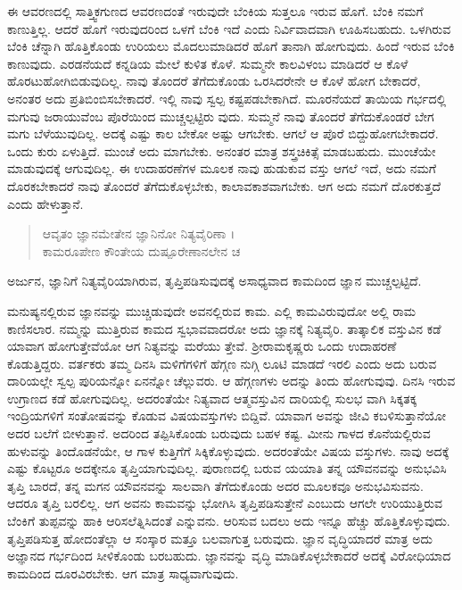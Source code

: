 ಈ ಆವರಣದಲ್ಲಿ ಸಾತ್ತ್ವಿಕಗುಣದ ಆವರಣದಂತೆ ಇರುವುದೇ ಬೆಂಕಿಯ ಸುತ್ತಲೂ ಇರುವ ಹೊಗೆ. ಬೆಂಕಿ ನಮಗೆ ಕಾಣುತ್ತಿಲ್ಲ. ಆದರೆ ಹೊಗೆ ಇರುವುದರಿಂದ ಒಳಗೆ ಬೆಂಕಿ ಇದೆ ಎಂದು ನಿರ್ವಿವಾದವಾಗಿ ಊಹಿಸಬಹುದು. ಒಳಗಿರುವ ಬೆಂಕಿ ಚೆನ್ನಾಗಿ ಹೊತ್ತಿಕೊಂಡು ಉರಿಯಲು ಮೊದಲುಮಾಡಿದರೆ ಹೊಗೆ ತಾನಾಗಿ ಹೋಗುವುದು. ಹಿಂದೆ ಇರುವ ಬೆಂಕಿ ಕಾಣುವುದು. ಎರಡನೆಯದೆ ಕನ್ನಡಿಯ ಮೇಲೆ ಕುಳಿತ ಕೊಳೆ. ಸುಮ್ಮನೇ ಕಾಲವಿಳಂಬ ಮಾಡಿದರೆ ಆ ಕೊಳೆ ಹೊರಟುಹೋಗಿಬಿಡುವುದಿಲ್ಲ. ನಾವು ತೊಂದರೆ ತೆಗೆದುಕೊಂಡು ಒರಸಿದರೇನೇ ಆ ಕೊಳೆ ಹೋಗ ಬೇಕಾದರೆ, ಅನಂತರ ಅದು ಪ್ರತಿಬಿಂಬಿಸಬೇಕಾದರೆ. ಇಲ್ಲಿ ನಾವು ಸ್ವಲ್ಪ ಕಷ್ಟಪಡಬೇಕಾಗಿದೆ. ಮೂರನೆಯದೆ ತಾಯಿಯ ಗರ್ಭದಲ್ಲಿ ಮಗುವು ಜರಾಯುವೆಂಬ ಪೊರೆಯಿಂದ ಮುಚ್ಚಲ್ಪಟ್ಟಿರು ವುದು. ಸುಮ್ಮನೆ ನಾವು ತೊಂದರೆ ತೆಗೆದುಕೊಂಡರೆ ಬೇಗ ಮಗು ಬೆಳೆಯುವುದಿಲ್ಲ. ಅದಕ್ಕೆ ಎಷ್ಟು ಕಾಲ ಬೇಕೋ ಅಷ್ಟು ಆಗಬೇಕು. ಆಗಲೆ ಆ ಪೊರೆ ಬಿದ್ದುಹೋಗಬೇಕಾದರೆ. ಒಂದು ಕುರು ಏಳುತ್ತಿದೆ. ಮುಂಚೆ ಅದು ಮಾಗಬೇಕು. ಅನಂತರ ಮಾತ್ರ ಶಸ್ತ್ರಚಿಕಿತ್ಸೆ ಮಾಡಬಹುದು. ಮುಂಚೆಯೇ ಮಾಡುವುದಕ್ಕೆ ಆಗುವುದಿಲ್ಲ. ಈ ಉದಾಹರಣೆಗಳ ಮೂಲಕ ನಾವು ಹುಡುಕುವ ವಸ್ತು ಆಗಲೆ ಇದೆ, ಅದು ನಮಗೆ ದೊರಕಬೇಕಾದರೆ ನಾವು ತೊಂದರೆ ತೆಗೆದುಕೊಳ್ಳಬೇಕು, ಕಾಲಾವಕಾಶವಾಗಬೇಕು. ಆಗ ಅದು ನಮಗೆ ದೊರಕುತ್ತದೆ ಎಂದು ಹೇಳುತ್ತಾನೆ.

\begin{verse}
ಆವೃತಂ ಜ್ಞಾನಮೇತೇನ ಜ್ಞಾನಿನೋ ನಿತ್ಯವೈರಿಣಾ ।\\ಕಾಮರೂಪೇಣ ಕೌಂತೇಯ ದುಷ್ಪೂರೇಣಾನಲೇನ ಚ 
\end{verse}

{\small ಅರ್ಜುನ, ಜ್ಞಾನಿಗೆ ನಿತ್ಯವೈರಿಯಾಗಿರುವ, ತೃಪ್ತಿಪಡಿಸುವುದಕ್ಕೆ ಅಸಾಧ್ಯವಾದ ಕಾಮದಿಂದ ಜ್ಞಾನ ಮುಚ್ಚಲ್ಪಟ್ಟಿದೆ.}

ಮನುಷ್ಯನಲ್ಲಿರುವ ಜ್ಞಾನವನ್ನು ಮುಚ್ಚಿಡುವುದೇ ಅವನಲ್ಲಿರುವ ಕಾಮ. ಎಲ್ಲಿ ಕಾಮವಿರುವುದೋ ಅಲ್ಲಿ ರಾಮ ಕಾಣಿಸಲಾರ. ನಮ್ಮನ್ನು ಮುತ್ತಿರುವ ಕಾಮದ ಸ್ವಭಾವವಾದರೋ ಅದು ಜ್ಞಾನಕ್ಕೆ ನಿತ್ಯವೈರಿ. ತಾತ್ಕಾಲಿಕ ವಸ್ತುವಿನ ಕಡೆ ಯಾವಾಗ ಹೋಗುತ್ತೇವೆಯೋ ಆಗ ನಿತ್ಯವನ್ನು ಮರೆಯು ತ್ತೇವೆ. ಶ್ರೀರಾಮಕೃಷ್ಣರು ಒಂದು ಉದಾಹರಣೆ ಕೊಡುತ್ತಿದ್ದರು. ವರ್ತಕರು ತಮ್ಮ ದಿನಸಿ ಮಳಿಗೆಗಳಿಗೆ ಹೆಗ್ಗಣ ನುಗ್ಗಿ ಲೂಟಿ ಮಾಡದೆ ಇರಲಿ ಎಂದು ಅದು ಬರುವ ದಾರಿಯಲ್ಲೇ ಸ್ವಲ್ಪ ಪುರಿಯನ್ನೋ ಏನನ್ನೋ ಚೆಲ್ಲುವರು. ಆ ಹೆಗ್ಗಣಗಳು ಅದನ್ನು ತಿಂದು ಹೋಗುವುವು. ದಿನಸಿ ಇರುವ ಉಗ್ರಾಣದ ಕಡೆ ಹೋಗುವುದಿಲ್ಲ. ಅದರಂತೆಯೇ ನಿತ್ಯವಾದ ಆತ್ಮವಸ್ತುವಿನ ದಾರಿಯಲ್ಲಿ ಸುಲಭ ವಾಗಿ ಸಿಕ್ಕತಕ್ಕ ಇಂದ್ರಿಯಗಳಿಗೆ ಸಂತೋಷವನ್ನು ಕೊಡುವ ವಿಷಯವಸ್ತುಗಳು ಬಿದ್ದಿವೆ. ಯಾವಾಗ ಅವನ್ನು ಜೀವಿ ಕಬಳಿಸುತ್ತಾನೆಯೋ ಅದರ ಬಲೆಗೆ ಬೀಳುತ್ತಾನೆ. ಅದರಿಂದ ತಪ್ಪಿಸಿಕೊಂಡು ಬರುವುದು ಬಹಳ ಕಷ್ಟ. ಮೀನು ಗಾಳದ ಕೊನೆಯಲ್ಲಿರುವ ಹುಳುವನ್ನು ತಿಂದೊಡನೆಯೇ, ಆ ಗಾಳ ಕುತ್ತಿಗೆಗೆ ಸಿಕ್ಕಿಕೊಳ್ಳುವುದು. ಅದರಂತೆಯೇ ವಿಷಯ ವಸ್ತುಗಳು. ನಾವು ಅದಕ್ಕೆ ಎಷ್ಟು ಕೊಟ್ಟರೂ ಅದಕ್ಕೇನೂ ತೃಪ್ತಿಯಾಗುವುದಿಲ್ಲ. ಪುರಾಣದಲ್ಲಿ ಬರುವ ಯಯಾತಿ ತನ್ನ ಯೌವನವನ್ನು ಅನುಭವಿಸಿ ತೃಪ್ತಿ ಬಾರದೆ, ತನ್ನ ಮಗನ ಯೌವನವನ್ನು ಸಾಲವಾಗಿ ತೆಗೆದುಕೊಂಡು ಅದರ ಮೂಲಕವೂ ಅನುಭವಿಸುವನು. ಆದರೂ ತೃಪ್ತಿ ಬರಲಿಲ್ಲ. ಆಗ ಅವನು ಕಾಮವನ್ನು ಭೋಗಿಸಿ ತೃಪ್ತಿಪಡಿಸುತ್ತೇನೆ ಎಂಬುದು ಆಗಲೇ ಉರಿಯುತ್ತಿರುವ ಬೆಂಕಿಗೆ ತುಪ್ಪವನ್ನು ಹಾಕಿ ಆರಿಸಲೆತ್ನಿಸಿದಂತೆ ಎನ್ನುವನು. ಆರಿಸುವ ಬದಲು ಅದು ಇನ್ನೂ ಹೆಚ್ಚು ಹೊತ್ತಿಕೊಳ್ಳುವುದು. ತೃಪ್ತಿಪಡಿಸುತ್ತ ಹೋದಂತೆಲ್ಲಾ ಆ ಸಂಸ್ಕಾರ ಮತ್ತೂ ಬಲವಾಗುತ್ತ ಬರುವುದು. ಜ್ಞಾನ ವೃದ್ಧಿಯಾದರೆ ಮಾತ್ರ ಅದು ಅಜ್ಞಾನದ ಗರ್ಭದಿಂದ ಸೀಳಿಕೊಂಡು ಬರಬಹುದು. ಜ್ಞಾನವನ್ನು ವೃದ್ಧಿ ಮಾಡಿಕೊಳ್ಳಬೇಕಾದರೆ ಅದಕ್ಕೆ ವಿರೋಧಿಯಾದ ಕಾಮದಿಂದ ದೂರವಿರಬೇಕು. ಆಗ ಮಾತ್ರ ಸಾಧ್ಯವಾಗುವುದು.

